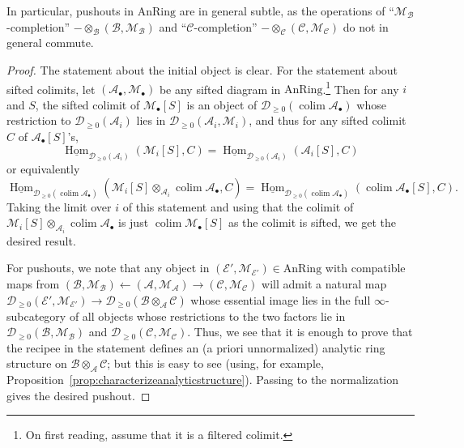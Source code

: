 \documentclass[11pt]{amsbook}
\DeclareMathOperator{\Hom}{Hom}
\newcommand{\intHom}{\underline{\Hom}}
\newcommand{\AnRing}{{\mathrm{AnRing}}}
\DeclareMathOperator{\colim}{colim}
\numberwithin{equation}{section}
\numberwithin{theorem}{section}
\theoremstyle{definition}
\begin{document}
In particular, pushouts in $\AnRing$ are in general subtle, as the operations of ``$\mathcal M_{\mathcal B}$-completion'' $-\otimes_{\mathcal B} (\mathcal B,\mathcal M_{\mathcal B})$ and ``$\mathcal C$-completion'' $-\otimes_{\mathcal C} (\mathcal C,\mathcal M_{\mathcal C})$ do not in general commute.

\begin{proof} The statement about the initial object is clear. For the statement about sifted colimits, let $(\mathcal A_\bullet,\mathcal M_\bullet)$ be any sifted diagram in $\AnRing$.\footnote{On first reading, assume that it is a filtered colimit.} Then for any $i$ and $S$, the sifted colimit of $\mathcal M_\bullet[S]$ is an object of $\mathcal D_{\geq 0}(\colim \mathcal A_\bullet)$ whose restriction to $\mathcal D_{\geq 0}(\mathcal A_i)$ lies in $\mathcal D_{\geq 0}(\mathcal A_i,\mathcal M_i)$, and thus for any sifted colimit $C$ of $\mathcal A_\bullet[S]$'s,
\[
\intHom_{\mathcal D_{\geq 0}(\mathcal A_i)}(\mathcal M_i[S],C) = \intHom_{\mathcal D_{\geq 0}(\mathcal A_i)}(\mathcal A_i[S],C)
\]
or equivalently
\[
\intHom_{\mathcal D_{\geq 0}(\colim \mathcal A_\bullet)}(\mathcal M_i[S]\otimes_{\mathcal A_i} \colim \mathcal A_\bullet,C) = \intHom_{\mathcal D_{\geq 0}(\colim \mathcal A_\bullet)}(\colim \mathcal A_\bullet[S],C).
\]
Taking the limit over $i$ of this statement and using that the colimit of $\mathcal M_i[S]\otimes_{\mathcal A_i} \colim \mathcal A_\bullet$ is just $\colim \mathcal M_\bullet[S]$ as the colimit is sifted, we get the desired result.

For pushouts, we note that any object in $(\mathcal E',\mathcal M_{\mathcal E'})\in \AnRing$ with compatible maps from $(\mathcal B,\mathcal M_{\mathcal B})\leftarrow (\mathcal A,\mathcal M_{\mathcal A})\to (\mathcal C,\mathcal M_{\mathcal C})$ will admit a natural map $\mathcal D_{\geq 0}(\mathcal E',\mathcal M_{\mathcal E'})\to \mathcal D_{\geq 0}(\mathcal B\otimes_{\mathcal A} \mathcal C)$ whose essential image lies in the full $\infty$-subcategory of all objects whose restrictions to the two factors lie in $\mathcal D_{\geq 0}(\mathcal B,\mathcal M_{\mathcal B})$ and $\mathcal D_{\geq 0}(\mathcal C,\mathcal M_{\mathcal C})$. Thus, we see that it is enough to prove that the recipee in the statement defines an (a priori unnormalized) analytic ring structure on $\mathcal B\otimes_{\mathcal A}\mathcal C$; but this is easy to see (using, for example, Proposition~\ref{prop:characterizeanalyticstructure}). Passing to the normalization gives the desired pushout.
\end{proof}
\end{document}
